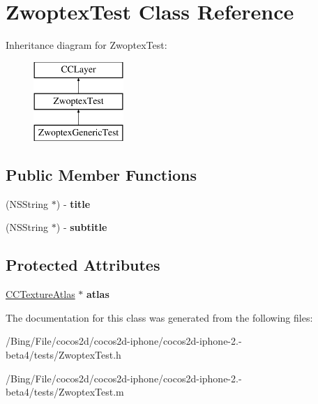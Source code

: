 \hypertarget{interface_zwoptex_test}{\section{Zwoptex\-Test Class Reference}
\label{interface_zwoptex_test}
}
Inheritance diagram for Zwoptex\-Test\-:\begin{figure}[H]
\begin{center}
\leavevmode
\includegraphics[height=3.000000cm]{interface_zwoptex_test}
\end{center}
\end{figure}
\subsection*{Public Member Functions}
\begin{DoxyCompactItemize}
\item 
\hypertarget{interface_zwoptex_test_a46d70f04b923e200cb9491be05cf3f0b}{(N\-S\-String $\ast$) -\/ {\bfseries title}}\label{interface_zwoptex_test_a46d70f04b923e200cb9491be05cf3f0b}

\item 
\hypertarget{interface_zwoptex_test_a48e558fde8efcdafc3049ffb8adbe333}{(N\-S\-String $\ast$) -\/ {\bfseries subtitle}}\label{interface_zwoptex_test_a48e558fde8efcdafc3049ffb8adbe333}

\end{DoxyCompactItemize}
\subsection*{Protected Attributes}
\begin{DoxyCompactItemize}
\item 
\hypertarget{interface_zwoptex_test_a7ec1d7fcb9c07833ff6b8fc1bf0cc0e0}{\hyperlink{interface_c_c_texture_atlas}{C\-C\-Texture\-Atlas} $\ast$ {\bfseries atlas}}\label{interface_zwoptex_test_a7ec1d7fcb9c07833ff6b8fc1bf0cc0e0}

\end{DoxyCompactItemize}


The documentation for this class was generated from the following files\-:\begin{DoxyCompactItemize}
\item 
/\-Bing/\-File/cocos2d/cocos2d-\/iphone/cocos2d-\/iphone-\/2.-\/beta4/tests/Zwoptex\-Test.\-h\item 
/\-Bing/\-File/cocos2d/cocos2d-\/iphone/cocos2d-\/iphone-\/2.-\/beta4/tests/Zwoptex\-Test.\-m\end{DoxyCompactItemize}
